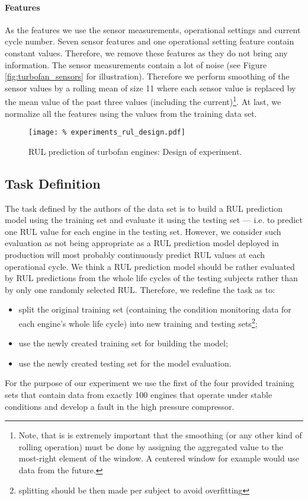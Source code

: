\paragraph{Features}
As the features we use the sensor measurements, operational settings and current cycle number.
Seven sensor features and one operational setting feature contain constant values.
Therefore, we remove these features as they do not bring any information.
The sensor measurements contain a lot of noise (see Figure \ref{fig:turbofan_sensors} for illustration).
Therefore we perform smoothing of the sensor values by a rolling mean of size 11 where each sensor value is replaced by the mean value of the past three values (including the current)\footnote{Note, that is is extremely important that the smoothing (or any other kind of rolling operation) must be done by assigning the aggregated value to the most-right element of the window. A centered window for example would use data from the future.}.
At last, we normalize all the features using the values from the training data set.


\begin{figure}[!htb]
	\centering
    \texttt{[image: \%
        experiments\_rul\_design.pdf]}
	\caption{RUL prediction of turbofan engines: Design of experiment.}
	\label{fig:experiments_rul_design}
\end{figure}

\subsection{Task Definition}
\label{sec:experiment_rul_task}

The task defined by the authors of the data set is to build a RUL prediction model using the training set and evaluate it using the testing set --- i.e. to predict one RUL value for each engine in the testing set.
However, we consider such evaluation as not being appropriate as a RUL prediction model deployed in production will most probably continuously predict RUL values at each operational cycle.
We think a RUL prediction model should be rather evaluated by RUL predictions from the whole life cycles of the testing subjects rather than by only one randomly selected RUL.
Therefore, we redefine the task as to:
\begin{itemize}
    \item split the original training set (containing the condition monitoring data for each engine's whole life cycle) into new training and testing sets\footnote{splitting should be then made per subject to avoid overfitting};
    \item use the newly created training set for building the model;
    \item use the newly created testing set for the model evaluation.
\end{itemize}
For the purpose of our experiment we use the first of the four provided training sets that contain data from exactly 100 engines that operate under stable conditions and develop a fault in the high pressure compressor.

